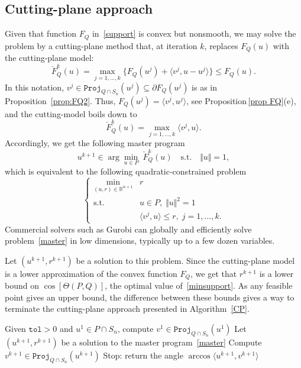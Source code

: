 \documentclass[hidelinks,onefignum,onetabnum]{siamart250211}
\theoremstyle{definition}
\theoremstyle{remark}
\newcommand{\R}{\mathbb R}
\newcommand{\inner}[2]{\langle#1,#2\rangle}
\newcommand{\norm}[1]{\textstyle{\Vert} #1 \textstyle{\Vert}}
\newcommand{\proj}{\mathtt{Proj}}
\begin{document}
\subsection{Cutting-plane approach}
Given that function $F_Q$ in~\eqref{support} is convex but nonsmooth, we may solve the problem by a cutting-plane method that, at iteration $k$, replaces $F_Q(u)$ with the cutting-plane model:
\[
\check F_Q^k(u)=\max_{j=1,\ldots,k} \{F_Q(u^j)+\inner{v^j}{u-u^j}\}\leq F_Q(u).
\]
In this notation,  $ v^j \in \proj_{Q\cap S_n}(u^j)\subseteq\partial F_Q(u^j)$ is as in Proposition~\ref{prop:FQ2}. Thus, $F_Q(u^j)=\inner{ v^j}{u^j}$, see Proposition\,\ref{prop FQ}(e), and the cutting-model boils down to 
\[
\check F_Q^k(u)=\max_{j=1,\ldots,k} \inner{ v^j}{u}.
\]
Accordingly, we get the following master program
\[
    u^{k+1} \in \arg\min_{u \in P} \; \check F_Q^k(u) \quad \mbox{s.t.}\quad \norm{u}=1,
\]
which is equivalent to the following quadratic-constrained problem
\begin{equation}\label{master}
    \left\{
    \begin{array}{llll}
    \displaystyle \min_{(u, r) \in \R^{n+1}} & r \\
     \mbox{s.t.}&  u\in P, \; \norm{u}^2=1\\
                & \inner{v^j}{u}\leq r,\; j=1,\ldots,k.
    \end{array}
    \right.
\end{equation}
Commercial solvers such as Gurobi can globally and efficiently solve problem~\eqref{master} in low dimensions, typically up to a few dozen variables.

Let $(u^{k+1},r^{k+1})$ be a solution to this problem. Since the cutting-plane model is a lower approximation of the convex function $F_Q$, we get that $r^{k+1}$ is a lower bound on $\cos[\Theta(P,Q)]$, the optimal value of~\eqref{minsupport}. As any feasible point gives an upper bound, the difference between these bounds gives a way to terminate the cutting-plane approach presented in Algorithm~\ref{CP}.

\begin{algorithm}
\caption{Cutting-plane algorithm for computing the angle $\Theta(P,Q)$}
\label{CP}
\begin{algorithmic}[1]
\STATE  Given $\mathtt{tol}> 0$ and $u^1 \in P\cap S_n$, compute $v^1 \in  \proj_{Q\cap S_n}(u^1)$ 
\STATE Let $(u^{k+1},r^{k+1})$ be a solution to the master program~\eqref{master} \label{lin:master}
\STATE Compute  $v^{k+1} \in \proj_{Q\cap S_n}(u^{k+1})$
\IF{$\inner{u^{k+1}}{v^{k+1}}-r^{k+1}\leq \mathtt{tol}$}
\STATE Stop: return the angle $\arccos{\inner{ u^{k+1}}{v^{k+1}}}$
\ENDIF
\ENDFOR
  \end{algorithmic}
\end{algorithm}
\end{document}
